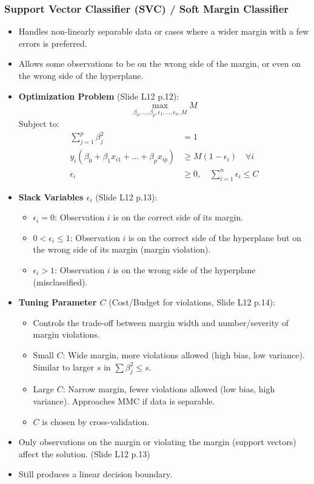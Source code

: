\documentclass[12pt,a4paper]{article}
\begin{document}
    \subsubsection{Support Vector Classifier (SVC) / Soft Margin Classifier }
        \begin{itemize}
            \item Handles non-linearly separable data or cases where a wider margin with a few errors is preferred.
            \item Allows some observations to be on the wrong side of the margin, or even on the wrong side of the hyperplane.
            \item \textbf{Optimization Problem} (Slide L12 p.12):
                $$ \max_{\beta_0, \dots, \beta_p, \epsilon_1, \dots, \epsilon_n, M} M $$
                Subject to:
                \begin{align}
                    \sum_{j=1}^p \beta_j^2 &= 1 \\
                    y_i (\beta_0 + \beta_1 x_{i1} + \dots + \beta_p x_{ip}) &\ge M(1 - \epsilon_i) \quad \forall i \\
                    \epsilon_i &\ge 0, \quad \sum_{i=1}^n \epsilon_i \le C
                \end{align}
            \item \textbf{Slack Variables $\epsilon_i$} (Slide L12 p.13):
                \begin{itemize}
                    \item $\epsilon_i = 0$: Observation $i$ is on the correct side of its margin.
                    \item $0 < \epsilon_i \le 1$: Observation $i$ is on the correct side of the hyperplane but on the wrong side of its margin (margin violation).
                    \item $\epsilon_i > 1$: Observation $i$ is on the wrong side of the hyperplane (misclassified).
                \end{itemize}
            \item \textbf{Tuning Parameter $C$} (Cost/Budget for violations, Slide L12 p.14):
                \begin{itemize}
                    \item Controls the trade-off between margin width and number/severity of margin violations.
                    \item Small $C$: Wide margin, more violations allowed (high bias, low variance). Similar to larger $s$ in $\sum \beta_j^2 \le s$.
                    \item Large $C$: Narrow margin, fewer violations allowed (low bias, high variance). Approaches MMC if data is separable.
                    \item $C$ is chosen by cross-validation.
                \end{itemize}
            \item Only observations on the margin or violating the margin (support vectors) affect the solution. (Slide L12 p.13)
            \item Still produces a linear decision boundary.
        \end{itemize}
\end{document}
